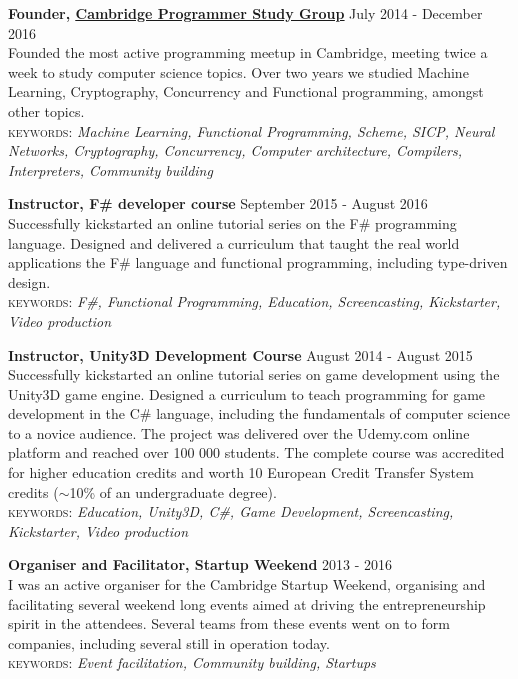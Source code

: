 \documentclass[10pt]{article}
\newcommand{\linkto}[2]{\href{#1}{\color{darkblue}\setulcolor{darkblue}\ul{#2}}}
\newcommand{\blankline}{\quad\pagebreak[2]}
\begin{document}
\blankline

\textbf{Founder, \linkto{https://www.meetup.com/Cambridge-Programmers-Study-Group/}{Cambridge Programmer Study Group}}  \hfill July 2014 - December 2016\\
Founded the most active programming meetup in Cambridge, meeting twice a week to study computer science topics. Over two years we studied Machine Learning, Cryptography, Concurrency and Functional programming, amongst other topics.\\
{\small \textsc{keywords:} \emph{Machine Learning, Functional Programming, Scheme, SICP, Neural Networks, Cryptography, Concurrency, Computer architecture, Compilers, Interpreters, Community building}}

\blankline

\textbf{Instructor, F\# developer course}  \hfill September 2015 - August 2016\\
Successfully kickstarted an online tutorial series on the F\# programming language. Designed and delivered a curriculum that taught the real world applications the F\# language and functional programming, including type-driven design.\\
{\small \textsc{keywords:} \emph{F\#, Functional Programming, Education, Screencasting, Kickstarter, Video production}}

\blankline

\textbf{Instructor, Unity3D Development Course}  \hfill August 2014 - August 2015 \\
Successfully kickstarted an online tutorial series on game development using the Unity3D game engine. Designed a curriculum to teach programming for game development in the C\# language, including the fundamentals of computer science to a novice audience. The project was delivered over the Udemy.com online platform and reached over 100 000 students. The complete course was accredited for higher education credits and worth 10 European Credit Transfer System credits ($\sim$10\% of an undergraduate degree).\\
{\small \textsc{keywords:} \emph{Education, Unity3D, C\#, Game Development, Screencasting, Kickstarter, Video production}}

\blankline

\textbf{Organiser and Facilitator, Startup Weekend}  \hfill 2013 - 2016\\
I was an active organiser for the Cambridge Startup Weekend, organising and facilitating several weekend long events aimed at driving the  entrepreneurship spirit in the attendees. Several teams from these events went on to form companies, including several still in operation today.\\
{\small \textsc{keywords:} \emph{Event facilitation, Community building, Startups}}
\end{document}

